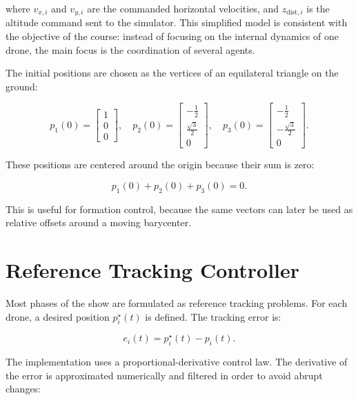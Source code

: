 where $v_{x,i}$ and $v_{y,i}$ are the commanded horizontal velocities, and $z_{\text{dist},i}$ is the altitude command sent to the simulator. This simplified model is consistent with the objective of the course: instead of focusing on the internal dynamics of one drone, the main focus is the coordination of several agents.

The initial positions are chosen as the vertices of an equilateral triangle on the ground:

\begin{equation}
    p_1(0)=
    \begin{bmatrix}
    1 \\
    0 \\
    0
    \end{bmatrix}, \quad
    p_2(0)=
    \begin{bmatrix}
    -\frac{1}{2} \\
    \frac{\sqrt{3}}{2} \\
    0
    \end{bmatrix}, \quad
    p_3(0)=
    \begin{bmatrix}
    -\frac{1}{2} \\
    -\frac{\sqrt{3}}{2} \\
    0
    \end{bmatrix}.
\end{equation}

These positions are centered around the origin because their sum is zero:

\begin{equation}
    p_1(0)+p_2(0)+p_3(0)=0.
\end{equation}

This is useful for formation control, because the same vectors can later be used as relative offsets around a moving barycenter.

\section{Reference Tracking Controller}

Most phases of the show are formulated as reference tracking problems. For each drone, a desired position $p_i^{\star}(t)$ is defined. The tracking error is:

\begin{equation}
    e_i(t)=p_i^{\star}(t)-p_i(t).
\end{equation}

The implementation uses a proportional-derivative control law. The derivative of the error is approximated numerically and filtered in order to avoid abrupt changes:

